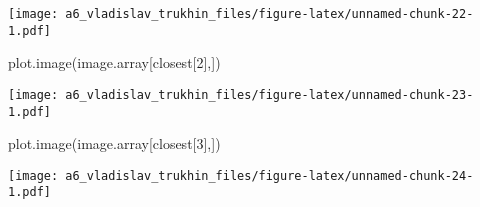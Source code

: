 \documentclass[
]{article}
\newenvironment{Shaded}{\begin{snugshade}}{\end{snugshade}}
\newcommand{\DecValTok}[1]{\textcolor[rgb]{0.00,0.00,0.81}{#1}}
\newcommand{\FunctionTok}[1]{\textcolor[rgb]{0.00,0.00,0.00}{#1}}
\newcommand{\NormalTok}[1]{#1}
\begin{document}
\texttt{[image: a6\_vladislav\_trukhin\_files/figure-latex/unnamed-chunk-22-1.pdf]}

\begin{Shaded}
\begin{Highlighting}[]
\FunctionTok{plot.image}\NormalTok{(image.array[closest[}\DecValTok{2}\NormalTok{],])}
\end{Highlighting}
\end{Shaded}

\texttt{[image: a6\_vladislav\_trukhin\_files/figure-latex/unnamed-chunk-23-1.pdf]}

\begin{Shaded}
\begin{Highlighting}[]
\FunctionTok{plot.image}\NormalTok{(image.array[closest[}\DecValTok{3}\NormalTok{],])}
\end{Highlighting}
\end{Shaded}

\texttt{[image: a6\_vladislav\_trukhin\_files/figure-latex/unnamed-chunk-24-1.pdf]}
\end{document}
